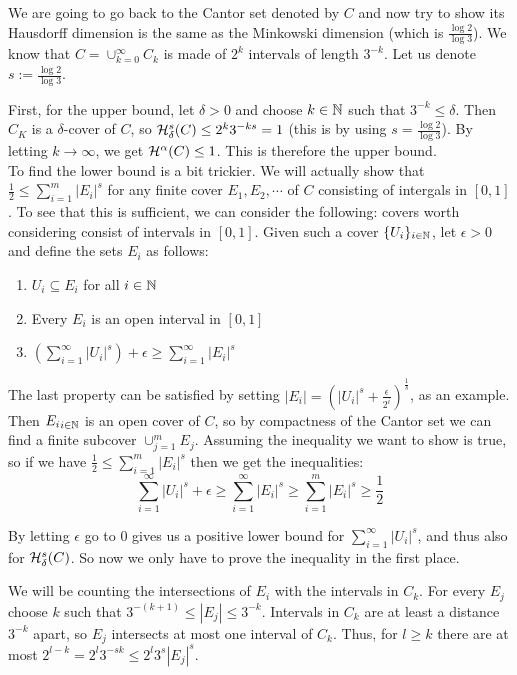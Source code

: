 \documentclass{article}
\begin{document}
\begin{example}\cite{Eijnnden-2018}
We are going to go back to the Cantor set denoted by $C$ and now try to show its Hausdorff dimension is the same as the Minkowski dimension (which is $\frac{\log{2}}{\log{3}}$). We know that $C=\cup_{k=0}^{\infty}C_k$ is made of $2^k$ intervals of length $3^{-k}$. Let us denote $s:=\frac{\log{2}}{\log{3}}$.

First, for the upper bound, let $\delta>0$ and choose $k\in \mathbb{N}$ such that $3^{-k}\leq\delta$. Then $C_K$ is a $\delta$-cover of $C$, so $\mathcal{H}_{\delta}^s(C)\leq 2^k3^{-ks}=1$ (this is by using $s=\frac{\log{2}}{\log{3}}$). By letting $k\rightarrow \infty$, we get $\mathcal{H}^{\alpha}(C)\leq 1$. This is therefore the upper bound.\\

To find the lower bound is a bit trickier. We will actually show that $\frac{1}{2}\leq \sum_{i=1}^m|E_i|^s$ for any finite cover $E_1,E_2,\cdots$ of $C$ consisting of intergals in $[0,1]$. To see that this is sufficient, we can consider the following: covers worth considering consist of intervals in $[0,1]$. Given such a cover $\{U_i\}_{i\in \mathbb{N}}$, let $\epsilon>0$ and define the sets $E_i$ as follows:
\begin{enumerate}
    \item $U_i\subseteq E_i$ for all $i\in \mathbb{N}$
    \item Every $E_i$ is an open interval in $[0,1]$
    \item $(\sum_{i=1}^{\infty}|U_i|^s)+\epsilon\geq \sum_{i=1}^{\infty}|E_i|^s$
\end{enumerate}
The last property can be satisfied by setting $|E_i|=(|U_i|^s+\frac{\epsilon}{2^i})^{\frac{1}{s}}$, as an example. Then ${E_i}_{i\in \mathbb{N}}$ is an open cover of $C$, so by compactness of the Cantor set we can find a finite subcover $\cup_{j=1}^m E_j$. Assuming the inequality we want to show is true, so if we have $\frac{1}{2}\leq \sum_{i=1}^m|E_i|^s$ then we get the inequalities:
$$\sum_{i=1}^{\infty}|U_i|^s+\epsilon \geq \sum_{i=1}^{\infty}|E_i|^s\geq \sum_{i=1}^m|E_i|^s\geq \frac{1}{2} $$

By letting $\epsilon$ go to $0$ gives us a positive lower bound for $\sum_{i=1}^{\infty}|U_i|^s$, and thus also for $\mathcal{H}_{\delta}^s(C)$. So now we only have to prove the inequality in the first place. 

We will be counting the intersections of $E_i$ with the intervals in $C_k$. For every $E_j$ choose $k$ such that $3^{-(k+1)}\leq|E_j|\leq3^{-k}$. Intervals in $C_k$ are at least a distance $3^{-k}$ apart, so $E_j$ intersects at most one interval of $C_k$. Thus, for $l\geq k$ there are at most $2^{l-k}=2^l3^{-sk}\leq 2^l3^s|E_j|^s$.


\end{example}
\end{document}
